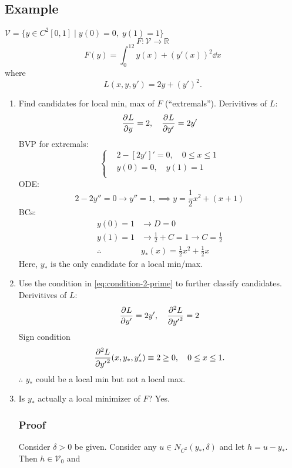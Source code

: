 \documentclass[12pt,twoside]{article}
\begin{document}
\subsection{Example}
$\mathcal{V}=\{y\in C^2[0,1]\;|\; y(0)=0,\; y(1)=1\}$
$$F:\mathcal{V}\rightarrow\mathbb{R}$$
$$F(y)=\int_0^12y(x)+{(y'(x))}^2\dd{x}$$
where $$L(x,y,y')=2y+{(y')}^2.$$

\begin{enumerate}
\item Find candidates for local min, max of $F$ (``extremals'').
  Derivitives of $L$:
  \begin{equation*}
    \pd{L}{y} = 2,\quad \pd{L}{y'} = 2y'
  \end{equation*}
  BVP for extremals:
  \begin{equation*} \left\{
      \begin{aligned}
        &2-\left[ 2y' \right]'=0,\quad 0\le x\le 1 \\
        &y(0)=0,\quad y(1)=1 \\
      \end{aligned} \right.
  \end{equation*}
  ODE:
  \begin{equation*}
    2-2y''=0\rightarrow y''=1, \implies y=\frac{1}{2}x^2 + (x+1)
  \end{equation*}
  BCs:
  \begin{equation*}
    \begin{aligned}
      y(0)=1&\rightarrow D=0 \\
      y(1)=1&\rightarrow \frac{1}{2}+C=1\rightarrow C=\frac{1}{2} \\
      \therefore & y_*(x) = \frac{1}{2}x^2 + \frac{1}{2} x
    \end{aligned}
  \end{equation*}
  Here, $y_*$ is the only candidate for a local min/max.
\item Use the condition in \cref{eq:condition-2-prime} to further classify
  candidates. Derivitives of $L$:
  \begin{equation*}
    \pd{L}{y'}=2y',\quad \pd[2]{L}{y'}=2
  \end{equation*}
  Sign condition
  \begin{equation*}
    \pd[2]{L}{y'}(x,y_*,y_*')\equiv 2\ge0,\quad 0\le x \le1.
  \end{equation*}
  $\therefore$ $y_*$ could be a local min but not a local max.
\item Is $y_*$ actually a local minimizer of $F$? Yes.
  \subsubsection{Proof}
  Consider $\delta>0$ be given. Consider any $u\in N_{C^2}(y_*,\delta)$ and let
  $h=u-y_*$. Then $h\in\mathcal{V}_0$ and


\end{enumerate}
\end{document}
